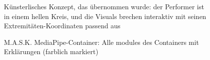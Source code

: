 \begin{figure}[htbp]
    \centering
    \caption{Künsterlisches Konzept, das übernommen wurde: der Performer ist in einem hellen Kreis, und die Visuals brechen interaktiv mit seinen Extremitäten-Koordinaten passend aus}
    \label{fig:composite_effects}
\end{figure}

\FloatBarrier
\begin{figure}[htbp]
    \centering
    \caption{M.A.S.K. MediaPipe-Container: Alle modules des Containers mit Erklärungen (farblich markiert)}
    \label{fig:main_interface}
\end{figure}

